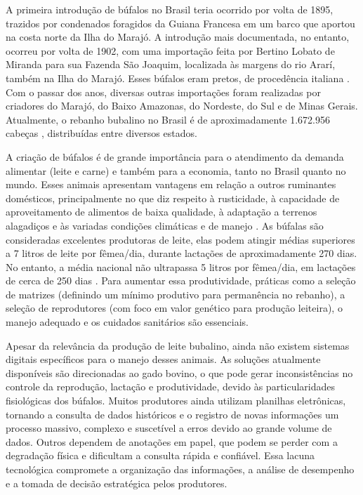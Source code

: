 A primeira introdução de búfalos no Brasil teria ocorrido por volta de 1895, trazidos por condenados foragidos da Guiana Francesa em um barco que aportou na costa norte da Ilha do Marajó. A introdução mais documentada, no entanto, ocorreu por volta de 1902, com uma importação feita por Bertino Lobato de Miranda para sua Fazenda São Joaquim, localizada às margens do rio Ararí, também na Ilha do Marajó. Esses búfalos eram pretos, de procedência italiana \cite{ABCB2016}. Com o passar dos anos, diversas outras importações foram realizadas por criadores do Marajó, do Baixo Amazonas, do Nordeste, do Sul e de Minas Gerais. Atualmente, o rebanho bubalino no Brasil é de aproximadamente 1.672.956 cabeças \cite{IBGE2023}, distribuídas entre diversos estados.

A criação de búfalos é de grande importância para o atendimento da demanda alimentar (leite e carne) e também para a economia, tanto no Brasil quanto no mundo. Esses animais apresentam vantagens em relação a outros ruminantes domésticos, principalmente no que diz respeito à rusticidade, à capacidade de aproveitamento de alimentos de baixa qualidade, à adaptação a terrenos alagadiços e às variadas condições climáticas e de manejo \cite{EMBRAPA2019}. As búfalas são consideradas excelentes produtoras de leite, elas podem atingir médias superiores a 7 litros de leite por fêmea/dia, durante lactações de aproximadamente 270 dias. No entanto, a média nacional não ultrapassa 5 litros por fêmea/dia, em lactações de cerca de 250 dias \cite{Embrapa1998}. Para aumentar essa produtividade, práticas como a seleção de matrizes (definindo um mínimo produtivo para permanência no rebanho), a seleção de reprodutores (com foco em valor genético para produção leiteira), o manejo adequado e os cuidados sanitários são essenciais.

Apesar da relevância da produção de leite bubalino, ainda não existem sistemas digitais específicos para o manejo desses animais. As soluções atualmente disponíveis são direcionadas ao gado bovino, o que pode gerar inconsistências no controle da reprodução, lactação e produtividade, devido às particularidades fisiológicas dos búfalos. Muitos produtores ainda utilizam planilhas eletrônicas, tornando a consulta de dados históricos e o registro de novas informações um processo massivo, complexo e suscetível a erros devido ao grande volume de dados. Outros dependem de anotações em papel, que podem se perder com a degradação física e dificultam a consulta rápida e confiável. Essa lacuna tecnológica compromete a organização das informações, a análise de desempenho e a tomada de decisão estratégica pelos produtores.

